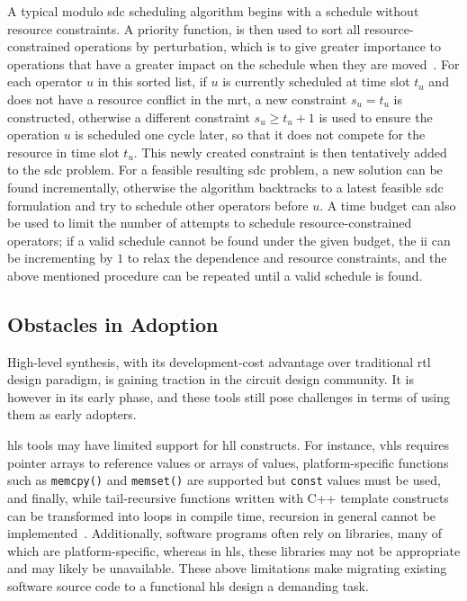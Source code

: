 A typical modulo \gls{sdc} scheduling algorithm begins with a schedule
without resource constraints.  A priority function, is then used to sort all
resource-constrained operations by perturbation, which is to give greater
importance to operations that have a greater impact on the schedule when they
are moved~\cite{canis14}.  For each operator $u$ in this sorted list, if $u$ is
currently scheduled at time slot $t_u$ and does not have a resource conflict
in the \gls{mrt}, a new constraint $s_u = t_u$ is constructed, otherwise a
different constraint $s_u \geq t_u + 1$ is used to ensure the operation $u$ is
scheduled one cycle later, so that it does not compete for the resource in time
slot $t_u$.  This newly created constraint is then tentatively added to the
\gls{sdc} problem.  For a feasible resulting \gls{sdc} problem, a new solution
can be found incrementally, otherwise the algorithm backtracks to a latest
feasible \gls{sdc} formulation and try to schedule other operators before $u$.
A time budget can also be used to limit the number of attempts to schedule
resource-constrained operators; if a valid schedule cannot be found under the
given budget, the \gls{ii} can be incrementing by $1$ to relax the dependence
and resource constraints, and the above mentioned procedure can be repeated
until a valid schedule is found.


\subsection{Obstacles in Adoption}
\label{bg:sub:obstacles_in_adoption}

High-level synthesis, with its development-cost advantage over traditional
\gls{rtl} design paradigm, is gaining traction in the circuit design community.
It is however in its early phase, and these tools still pose challenges in
terms of using them as early adopters.

\Gls{hls} tools may have limited support for \gls{hll} constructs.  For
instance, \gls{vhls} requires pointer arrays to reference values or arrays of
values, platform-specific functions such as \verb|memcpy()| and \verb|memset()|
are supported but \verb|const| values must be used, and finally, while
tail-recursive functions written with C++ template constructs can be
transformed into loops in compile time, recursion in general cannot be
implemented~\cite{vivado_hls}.  Additionally, software programs often rely
on libraries, many of which are platform-specific, whereas in \gls{hls}\@,
these libraries may not be appropriate and may likely be unavailable.  These
above limitations make migrating existing software source code to a functional
\gls{hls} design a demanding task.

